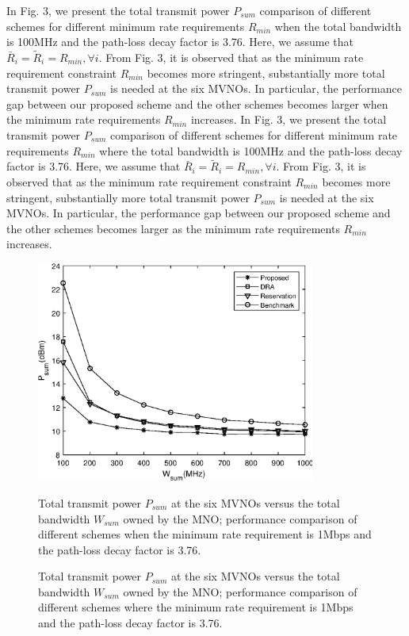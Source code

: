 \documentclass[journal]{IEEEtran}
\begin{document}
\begin{IEEEkeywords}
In Fig. 3, we present the total transmit power $P_{sum}$ comparison of different schemes for different minimum rate requirements $R_{min}$ when the total bandwidth is 100MHz and the path-loss decay factor is 3.76. Here, we assume that $\bar{R}_i = \tilde{R}_i= R_{min}, \forall i$. From Fig. 3, it is observed that as the minimum rate requirement constraint $R_{min}$ becomes more stringent, substantially more total transmit power $P_{sum}$ is needed at the six MVNOs. In particular, the performance gap between our proposed scheme and the other schemes becomes larger when the minimum rate requirements $R_{min}$ increases.
In Fig. 3, we present the total transmit power $P_{sum}$ comparison of different schemes for different minimum rate requirements $R_{min}$ where the total bandwidth is 100MHz and the path-loss decay factor is 3.76. Here, we assume that $\bar{R}_i = \tilde{R}_i= R_{min}, \forall i$. From Fig. 3, it is observed that as the minimum rate requirement constraint $R_{min}$ becomes more stringent, substantially more total transmit power $P_{sum}$ is needed at the six MVNOs. In particular, the performance gap between our proposed scheme and the other schemes becomes larger as the minimum rate requirements $R_{min}$ increases.

\begin{figure}
	\centering
	\includegraphics[width=3.6in]{P_wsum.eps}
	\caption{Total transmit power $P_{sum}$ at the six MVNOs versus the total bandwidth $W_{sum}$ owned by the MNO; performance comparison of different schemes when the minimum rate requirement is 1Mbps and the path-loss decay factor is 3.76.}
	\caption{Total transmit power $P_{sum}$ at the six MVNOs versus the total bandwidth $W_{sum}$ owned by the MNO; performance comparison of different schemes where the minimum rate requirement is 1Mbps and the path-loss decay factor is 3.76.}
\end{figure}


\end{IEEEkeywords}
\end{document}

